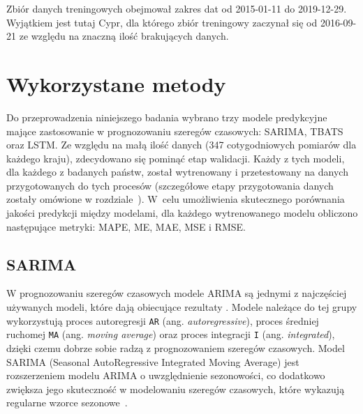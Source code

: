 \documentclass[polish, twoside, 12pt, a4paper]{article}
\theoremstyle{definition}
\theoremstyle{plain}
\theoremstyle{remark}
\newcommand{\code}[1]{\lstinline{#1}}
\begin{document}
Zbiór danych treningowych obejmował zakres dat od 2015-01-11 do 2019-12-29. Wyjątkiem jest tutaj Cypr, dla którego zbiór treningowy zaczynał się od 2016-09-21 ze względu na znaczną ilość brakujących danych. 

\clearpage
\section{Wykorzystane metody}\label{sec:metody}

Do przeprowadzenia niniejszego badania wybrano trzy modele predykcyjne mające zastosowanie w prognozowaniu szeregów czasowych: SARIMA, TBATS oraz LSTM. Ze względu na małą ilość danych (347 cotygodniowych pomiarów dla każdego kraju), zdecydowano się pominąć etap walidacji. Każdy z tych modeli, dla każdego z badanych państw, został wytrenowany i przetestowany na danych przygotowanych do tych procesów (szczegółowe etapy przygotowania danych zostały omówione w rozdziale~\textit{}). W~celu umożliwienia skutecznego porównania jakości predykcji między modelami, dla każdego wytrenowanego modelu obliczono następujące metryki: MAPE, ME, MAE, MSE i RMSE.

\subsection{SARIMA}

W prognozowaniu szeregów czasowych modele ARIMA są jednymi z najczęściej używanych modeli, które dają obiecujące rezultaty \citep{elsaraiti2021}. Modele należące do tej grupy wykorzystują proces autoregresji \code{AR} (ang. \textit{autoregressive}), proces średniej ruchomej \code{MA} (ang. \textit{moving average}) oraz proces integracji \code{I} (ang. \textit{integrated}), dzięki czemu dobrze sobie radzą z prognozowaniem szeregów czasowych. Model SARIMA (Seasonal AutoRegressive Integrated Moving Average) jest rozszerzeniem modelu ARIMA o uwzględnienie sezonowości, co dodatkowo zwiększa jego skuteczność w modelowaniu szeregów czasowych, które wykazują regularne wzorce sezonowe~\citep{montgomery2011}. 
\end{document}

